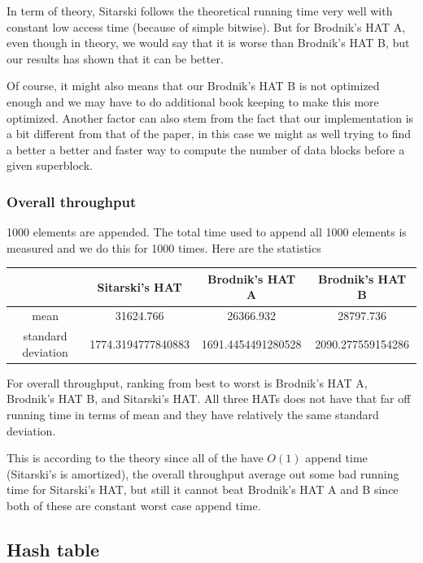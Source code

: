 \documentclass{article} %
\begin{document}
    In term of theory, Sitarski follows the theoretical running time very well with constant low access time (because of simple bitwise).
    But for Brodnik's HAT A, even though in theory, we would say that it is worse than Brodnik's HAT B, but our results has shown that it can be better.

    Of course, it might also means that our Brodnik's HAT B is not optimized enough and we may have to do additional book keeping to make this more optimized.
    Another factor can also stem from the fact that our implementation is a bit different from that of the paper, in this case we might as well trying to find a better
    a better and faster way to compute the number of data blocks before a given superblock.

    \subsubsection*{Overall throughput}
    1000 elements are appended. The total time used to append all 1000 elements is measured and we do this for 1000 times.
    Here are the statistics
    \begin{center}
        \begin{tabular}{|c|c|c|c|}\hline
            & Sitarski's HAT & Brodnik's HAT A & Brodnik's HAT B\\\hline
            mean &  31624.766 & 26366.932 & 28797.736\\\hline
            standard deviation & 1774.3194777840883  & 1691.4454491280528 & 2090.277559154286\\\hline 
        \end{tabular}
    \end{center}
    For overall throughput, ranking from best to worst is Brodnik's HAT A, Brodnik's HAT B, and Sitarski's HAT.
    All three HATs does not have that far off running time in terms of mean and they have relatively the same standard deviation.

    This is according to the theory since all of the have $O(1)$ append time (Sitarski's is amortized), the overall throughput
    average out some bad running time for Sitarski's HAT, but still it cannot beat Brodnik's HAT A and B since both of these are constant worst case append time.


    \subsection*{Hash table}
\end{document}
